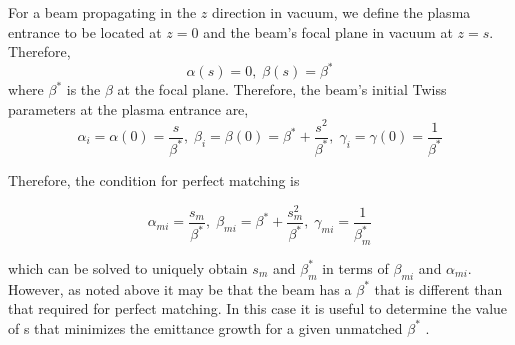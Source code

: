 \documentclass[%
reprint, superscriptaddress,
 amsmath,amssymb, aps,
prstab,
]{revtex4-2}
\begin{document}
%
For a beam propagating in the $z$ direction in vacuum,
we define the plasma entrance to be located at $z=0$ and the beam's
focal plane in vacuum at $z=s$. Therefore, \[ \alpha(s) = 0,\; \beta(s) =
\beta^* \] where $\beta^*$ is the $\beta$ at the focal plane.
Therefore, the beam's initial Twiss parameters at the plasma entrance
are, \begin{equation} \alpha_i = \alpha(0) = \frac{s}{\beta^*},\;
\beta_i = \beta(0) = \beta^* + \frac{s^2}{\beta^*},\; \gamma_i =
\gamma(0) = \frac{1}{\beta^*} \label{TwissS} \end{equation}

Therefore, the condition for perfect matching is

\begin{equation} \alpha_{mi} =  \frac{s_m}{\beta^*},\;
\beta_{mi} =  \beta^* + \frac{s_m^2}{\beta^*},\; \gamma_{mi } = \frac{1}{\beta_m^*} \label{TwissS} \end{equation}

which can be solved to uniquely obtain $s_m$ and $\beta_m^*$ in terms of $\beta_{mi}$ and $\alpha_{mi}$.  However, as noted above it may be that the beam has a  $\beta^*$ that is different than that required for perfect matching. In this case it is useful to determine the value of s that minimizes the emittance growth  for a given  unmatched $\beta^*$ . 
\end{document}
